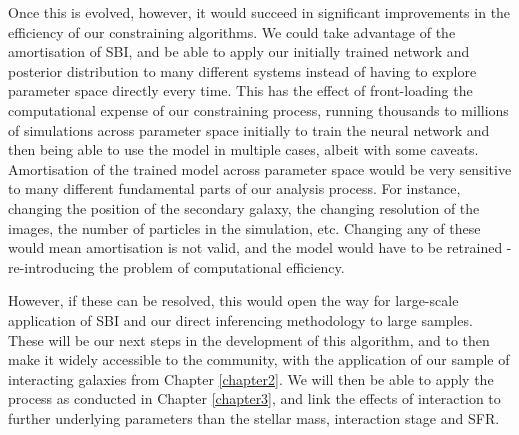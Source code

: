 Once this is evolved, however, it would succeed in significant improvements in the efficiency of our constraining algorithms. We could take advantage of the amortisation of SBI, and be able to apply our initially trained network and posterior distribution to many different systems instead of having to explore parameter space directly every time. This has the effect of front-loading the computational expense of our constraining process, running thousands to millions of simulations across parameter space initially to train the neural network and then being able to use the model in multiple cases, albeit with some caveats. Amortisation of the trained model across parameter space would be very sensitive to many different fundamental parts of our analysis process. For instance, changing the position of the secondary galaxy, the changing resolution of the images, the number of particles in the simulation, etc\DIFaddbegin {}\DIFaddend . Changing any of these would mean amortisation is not valid, and the model would have to be retrained - re-introducing the problem of computational efficiency. 

However, if these \DIFdelbegin {}\DIFdelend \DIFaddbegin {}\DIFaddend can be resolved, this would open the way for large-scale application of SBI and our direct inferencing methodology to large samples. These will be our next steps in the development of this algorithm, and to then make it widely accessible to the community, with the application of our sample of interacting galaxies from Chapter \ref{chapter2}. We will then be able to apply the process as conducted in Chapter \ref{chapter3}, and link the effects of interaction to further underlying parameters than the stellar mass, interaction stage and SFR.